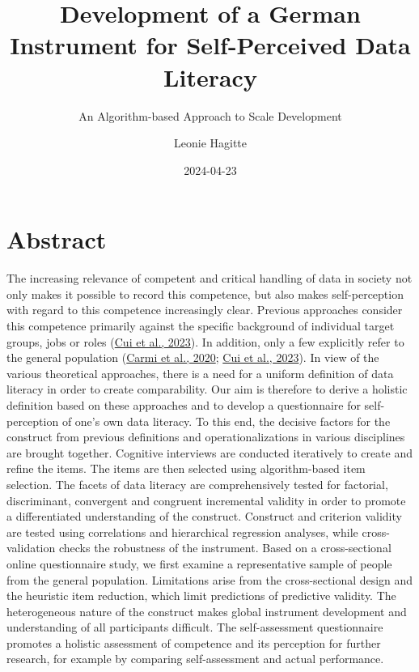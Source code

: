 \documentclass[
  12pt,
  a4paper,
  twoside]{article}
\title{Development of a German Instrument for Self-Perceived Data Literacy}
\subtitle{An Algorithm-based Approach to Scale Development}
\author{Leonie Hagitte}
\date{2024-04-23}
\begin{document}
\maketitle

{
\setcounter{tocdepth}{2}
\tableofcontents
}
\newpage\null\thispagestyle{empty}\newpage

\hypertarget{abstract}{%
\section*{Abstract}\label{abstract}}

The increasing relevance of competent and critical handling of data in society not only makes it possible to record this competence, but also makes self-perception with regard to this competence increasingly clear. Previous approaches consider this competence primarily against the specific background of individual target groups, jobs or roles (\protect\hyperlink{ref-Cui2023}{Cui et al., 2023}). In addition, only a few explicitly refer to the general population (\protect\hyperlink{ref-Carmi2020}{Carmi et al., 2020}; \protect\hyperlink{ref-Cui2023}{Cui et al., 2023}). In view of the various theoretical approaches, there is a need for a uniform definition of data literacy in order to create comparability.
Our aim is therefore to derive a holistic definition based on these approaches and to develop a questionnaire for self-perception of one's own data literacy. To this end, the decisive factors for the construct from previous definitions and operationalizations in various disciplines are brought together. Cognitive interviews are conducted iteratively to create and refine the items. The items are then selected using algorithm-based item selection. The facets of data literacy are comprehensively tested for factorial, discriminant, convergent and congruent incremental validity in order to promote a differentiated understanding of the construct. Construct and criterion validity are tested using correlations and hierarchical regression analyses, while cross-validation checks the robustness of the instrument.
Based on a cross-sectional online questionnaire study, we first examine a representative sample of people from the general population. Limitations arise from the cross-sectional design and the heuristic item reduction, which limit predictions of predictive validity. The heterogeneous nature of the construct makes global instrument development and understanding of all participants difficult.
The self-assessment questionnaire promotes a holistic assessment of competence and its perception for further research, for example by comparing self-assessment and actual performance.
\end{document}

